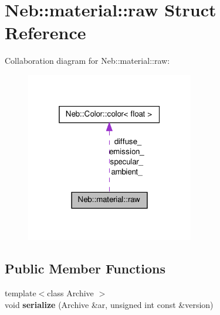 \hypertarget{structNeb_1_1material_1_1raw}{\section{\-Neb\-:\-:material\-:\-:raw \-Struct \-Reference}
\label{structNeb_1_1material_1_1raw}
}


\-Collaboration diagram for \-Neb\-:\-:material\-:\-:raw\-:\nopagebreak
\begin{figure}[H]
\begin{center}
\leavevmode
\includegraphics[width=208pt]{structNeb_1_1material_1_1raw__coll__graph}
\end{center}
\end{figure}
\subsection*{\-Public \-Member \-Functions}
\begin{DoxyCompactItemize}
\item 
\hypertarget{structNeb_1_1material_1_1raw_a020d5d21bc692dcba3a8d2dec53871e1}{{\footnotesize template$<$class Archive $>$ }\\void {\bfseries serialize} (\-Archive \&ar, unsigned int const \&version)}\label{structNeb_1_1material_1_1raw_a020d5d21bc692dcba3a8d2dec53871e1}

\end{DoxyCompactItemize}
